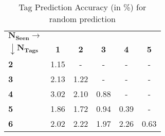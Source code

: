 \begin{table}
\begin{center}
\caption{Tag Prediction Accuracy (in \%) for random prediction}
\label{tab:TPFlickr117Random}
\begin{tabular}{|p{2cm}|c|c|c|c|c|}
		\hline
		{$\boldsymbol{N_{Seen} \rightarrow}$} & &  &  &  &\\ 
		{$\boldsymbol{\downarrow N_{Tags}}$} & \textbf{1} & \textbf{2} & \textbf{3} & \textbf{4} & \textbf{5}   \\ 
		\hline 		
		\textbf{2} & 1.15 & - & - & - & -\\ 
		\hline
		\textbf{3} & 2.13 & 1.22 & - & - & -\\ 
		\hline
		\textbf{4} & 3.02 & 2.10 & 0.88 & - & -\\ 
		\hline
		\textbf{5} & 1.86 & 1.72 & 0.94 & 0.39 & -\\ 
		\hline
		\textbf{6} & 2.02 & 2.22 & 1.97 & 2.26 & 0.63 \\ 
		\hline
\end{tabular}
\end{center}
\end{table}





